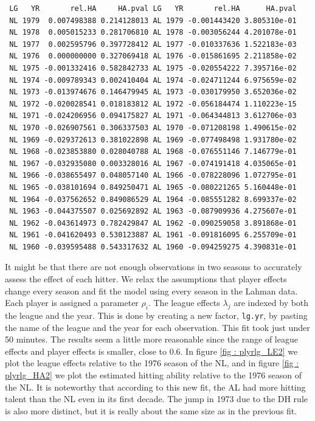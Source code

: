 \documentclass [52pt] {article}
\begin{document}
\begin{verbatim}
 LG   YR       rel.HA     HA.pval LG   YR       rel.HA      HA.pval
 NL 1979  0.007498388 0.214128013 AL 1979 -0.001443420 3.805310e-01
 NL 1978  0.005015233 0.281706810 AL 1978 -0.003056244 4.201078e-01
 NL 1977  0.002595796 0.397728412 AL 1977 -0.010337636 1.522183e-03
 NL 1976  0.000000000 0.327069418 AL 1976 -0.015861695 2.211858e-02
 NL 1975 -0.001332416 0.582842733 AL 1975 -0.020554222 7.395716e-02
 NL 1974 -0.009789343 0.002410404 AL 1974 -0.024711244 6.975659e-02
 NL 1973 -0.013974676 0.146479945 AL 1973 -0.030179950 3.652036e-02
 NL 1972 -0.020028541 0.018183812 AL 1972 -0.056184474 1.110223e-15
 NL 1971 -0.024206956 0.094175827 AL 1971 -0.064344813 3.612706e-03
 NL 1970 -0.026907561 0.306337503 AL 1970 -0.071208198 1.490615e-02
 NL 1969 -0.029372613 0.381022898 AL 1969 -0.077498498 1.931780e-02
 NL 1968 -0.023853880 0.028040788 AL 1968 -0.076551146 7.146779e-01
 NL 1967 -0.032935080 0.003328016 AL 1967 -0.074191418 4.035065e-01
 NL 1966 -0.038655497 0.048057140 AL 1966 -0.078228096 1.072795e-01
 NL 1965 -0.038101694 0.849250471 AL 1965 -0.080221265 5.160448e-01
 NL 1964 -0.037562652 0.849086529 AL 1964 -0.085551282 8.699337e-02
 NL 1963 -0.044375507 0.025692892 AL 1963 -0.087909936 4.275607e-01
 NL 1962 -0.043614973 0.782429847 AL 1962 -0.090259058 3.891868e-01
 NL 1961 -0.041620493 0.530123887 AL 1961 -0.091816095 6.255709e-01
 NL 1960 -0.039595488 0.543317632 AL 1960 -0.094259275 4.390831e-01
\end{verbatim}
It might be that there are not enough observations in two seasons to accurately assess the effect of each hitter.  We relax the assumptions that player effects change every season and fit the model using every season in the Lahman data.  Each player is assigned a parameter $\rho_i$.  The league effects $\lambda_j$ are indexed by both the league and the year.  This is done by creating a new factor, \verb|lg.yr|, by pasting the name of the league and the year for each observation. This fit took just under 50 minutes.  The results seem a little more reasonable since the range of league effects and player effects is smaller, close to 0.6.  In figure \ref{fig : plyrlg_LE2} we plot the league effects relative to the 1976 season of the NL, and in figure \ref{fig : plyrlg_HA2} we plot the estimated hitting ability relative to the 1976 season of the NL.  It is noteworthy that according to this new fit, the AL had more hitting talent than the NL even in its first decade.  The jump in 1973 due to the DH rule is also more distinct, but it is really about the same size as in the previous fit.
\end{document}
